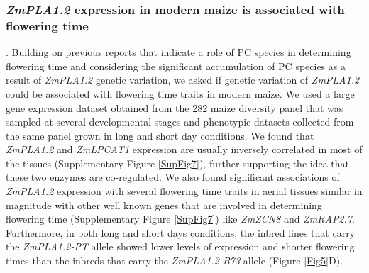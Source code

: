 \documentclass[9pt,twocolumn,twoside]{BioRxiv}
\begin{document}
 
\subsubsection{\textit{ZmPLA1.2} expression in modern maize is associated with flowering time}. 
Building on previous reports that indicate a role of PC species in determining flowering time \cite{Nakamura2014-qf, Riedelsheimer2013-bd} and considering the significant accumulation of PC species as a result of \textit{ZmPLA1.2} genetic variation, we asked if genetic variation of \textit{ZmPLA1.2} could be associated with flowering time traits in modern maize. 
We used a large gene expression dataset obtained from the 282 maize diversity panel that was sampled at several developmental stages \cite{Kremling2018-gn} and phenotypic datasets collected from the same panel grown in long and short day conditions. 
We found that \textit{ZmPLA1.2} and \textit{ZmLPCAT1} expression are usually inversely correlated in most of the tissues (Supplementary Figure \ref{SupFig7}), further supporting the idea that these two enzymes are co-regulated. 
We also found significant associations of \textit{ZmPLA1.2} expression with several flowering time traits in aerial tissues similar in magnitude with other well known genes that are involved in determining flowering time (Supplementary Figure \ref{SupFig7}) like \textit{ZmZCN8} and \textit{ZmRAP2.7}.
Furthermore, in both long and short days conditions, the inbred lines that carry the \textit{ZmPLA1.2-PT} allele showed lower levels of expression and shorter flowering times than the inbreds that carry the \textit{ZmPLA1.2-B73} allele  (Figure \ref{Fig5}D). 
\end{document}
